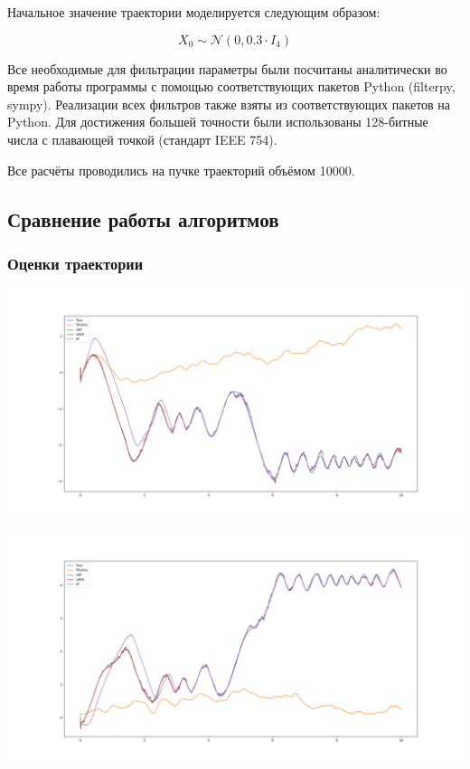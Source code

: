 \documentclass[12pt]{article}
\begin{document}
Начальное значение траектории моделируется следующим образом:

\[
	X_0 \sim \mathcal{N}(0, 0.3 \cdot I_4)
\]

Все необходимые для фильтрации параметры были посчитаны аналитически во время работы программы с помощью соответствующих пакетов Python (filterpy, sympy). Реализации всех фильтров также взяты из соответствующих пакетов на Python. Для достижения большей точности были использованы 128-битные числа с плавающей точкой (стандарт IEEE 754).

Все расчёты проводились на пучке траекторий объёмом 10000.

\subsection{Сравнение работы алгоритмов}
\begin{landscape}
	\subsubsection{Оценки траектории}
	\includegraphics[width=1.0\linewidth]{example/estimate_0.png}\newpage
\end{landscape}

\begin{landscape}
	\includegraphics[width=1.0\linewidth]{example/estimate_1.png}\newpage
\end{landscape}
\end{document}

